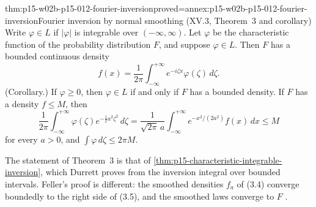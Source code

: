 \begin{hbtheorem}{thm:p15-w02b-p15-012-fourier-inversion}{proved=annex:p15-w02b-p15-012-fourier-inversion}{Fourier inversion by normal smoothing (XV.3, Theorem~3 and corollary)}
Write \(\varphi\in L\) if \(|\varphi|\) is integrable over
\((-\infty,\infty)\). Let \(\varphi\) be the characteristic function of the
probability distribution \(F\), and suppose \(\varphi\in L\). Then \(F\) has a
bounded continuous density
\[
 f(x)=\frac1{2\pi}\int_{-\infty}^{+\infty}e^{-i\zeta x}\varphi(\zeta)\,d\zeta.
 \tag{3.5}
\]
(Corollary.) If \(\varphi\geq0\), then \(\varphi\in L\) if and only if \(F\)
has a bounded density. If \(F\) has a density \(f\leq M\), then
\[
 \frac1{2\pi}\int_{-\infty}^{+\infty}\varphi(\zeta)e^{-\frac12a^2\zeta^2}\,d\zeta
  =\frac1{\sqrt{2\pi}\,a}\int_{-\infty}^{+\infty}e^{-x^2/(2a^2)}f(x)\,dx\leq M
 \tag{3.7}
\]
for every \(a>0\), and \(\int\varphi\,d\zeta\leq2\pi M\).
\end{hbtheorem}

The statement of Theorem~3 is that of
\cref{thm:p15-characteristic-integrable-inversion}, which Durrett proves from
the inversion integral over bounded intervals. Feller's proof is different: the
smoothed densities \(f_a\) of (3.4) converge boundedly to the right side of
(3.5), and the smoothed laws converge to \(F\)
\cite[vol.~II, XV.3, pp.~509--510]{Feller1971ProbabilityII}.

